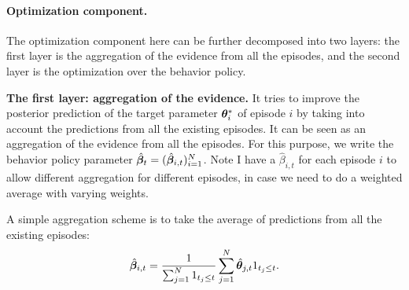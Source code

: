 \documentclass{article}
\newcommand{\sam}[1]{
  {\color{blue} [SAM: {#1}]}
 }
\begin{document}
\paragraph{Optimization component.} The optimization component here can be further decomposed into two layers: the first layer is the aggregation of the evidence from all the episodes, and the second layer is the optimization over the behavior policy.




\textbf{The first layer: aggregation of the evidence.} It tries to improve the posterior prediction of the target parameter ${\bm{\theta}}^*_i$ of episode $i$ by taking into account the predictions from all the existing episodes. It can be seen as an aggregation of the evidence from all the episodes. For this purpose, we write the behavior policy parameter $\hat {{\bm{\beta}}}_{t} = (\hat {{\bm{\beta}}}_{i, t})_{i = 1}^N$. Note I have a $\hat \beta_{i, t}$ for each episode $i$ to allow different aggregation for different episodes, in case we need to do a weighted average with varying weights.

A simple aggregation scheme is to take the average of predictions from all the existing episodes:
$$
    \hat {{\bm{\beta}}}_{i, t} = \frac{1}{\sum_{j = 1}^N 1_{t_j\le t}} \sum_{j = 1}^N \hat {{\bm{\theta}}}_{j, t}1_{t_j\le t}.
$$



\end{document}

